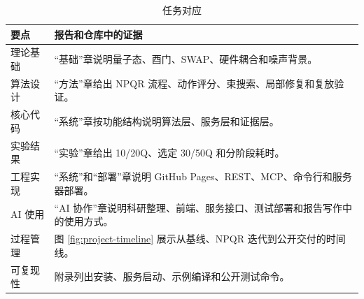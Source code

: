 \begin{table}[H]
  \centering
  \caption{任务对应}
  \label{tab:delivery-mapping}
  \begin{tabularx}{\linewidth}{lY}
    \toprule
    要点 & 报告和仓库中的证据 \\
    \midrule
    理论基础 & “基础”章说明量子态、酉门、SWAP、硬件耦合和噪声背景。\\
    算法设计 & “方法”章给出 NPQR 流程、动作评分、束搜索、局部修复和复放验证。\\
    核心代码 & “系统”章按功能结构说明算法层、服务层和证据层。\\
    实验结果 & “实验”章给出 10/20Q、选定 30/50Q 和分阶段耗时。\\
    工程实现 & “系统”和“部署”章说明 GitHub Pages、REST、MCP、命令行和服务器部署。\\
    AI 使用 & “AI 协作”章说明科研整理、前端、服务接口、测试部署和报告写作中的使用方式。\\
    过程管理 & 图 \ref{fig:project-timeline} 展示从基线、NPQR 迭代到公开交付的时间线。\\
    可复现性 & 附录列出安装、服务启动、示例编译和公开测试命令。\\
    \bottomrule
  \end{tabularx}
\end{table}
